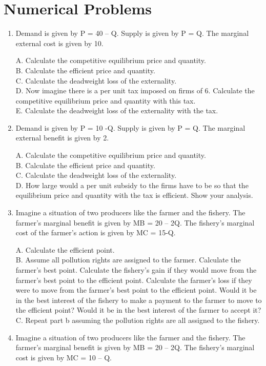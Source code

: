 \documentclass[
]{book}
\begin{document}
\hypertarget{numerical-problems}{%
\section{Numerical Problems}\label{numerical-problems}}

\begin{enumerate}
\def\labelenumi{\arabic{enumi}.}
\item
  Demand is given by P = 40 -- Q. Supply is given by P = Q. The marginal external cost is given by 10.

  A. Calculate the competitive equilibrium price and quantity.\\
  B. Calculate the efficient price and quantity.\\
  C. Calculate the deadweight loss of the externality.\\
  D. Now imagine there is a per unit tax imposed on firms of 6. Calculate the competitive equilibrium price and quantity with this tax.\\
  E. Calculate the deadweight loss of the externality with the tax.
\item
  Demand is given by P = 10 -Q. Supply is given by P = Q. The marginal external benefit is given by 2.

  A. Calculate the competitive equilibrium price and quantity.\\
  B. Calculate the efficient price and quantity.\\
  C. Calculate the deadweight loss of the externality.\\
  D. How large would a per unit subsidy to the firms have to be so that the equilibrium price and quantity with the tax is efficient. Show your analysis.
\item
  Imagine a situation of two producers like the farmer and the fishery. The farmer's marginal benefit is given by MB = 20 -- 2Q. The fishery's marginal cost of the farmer's action is given by MC = 15-Q.

  A. Calculate the efficient point.\\
  B. Assume all pollution rights are assigned to the farmer. Calculate the farmer's best point. Calculate the fishery's gain if they would move from the farmer's best point to the efficient point. Calculate the farmer's loss if they were to move from the farmer's best point to the efficient point. Would it be in the best interest of the fishery to make a payment to the farmer to move to the efficient point? Would it be in the best interest of the farmer to accept it?\\
  C. Repeat part b assuming the pollution rights are all assigned to the fishery.
\item
  Imagine a situation of two producers like the farmer and the fishery. The farmer's marginal benefit is given by MB = 20 -- 2Q. The fishery's marginal cost is given by MC = 10 -- Q.


\end{enumerate}
\end{document}
